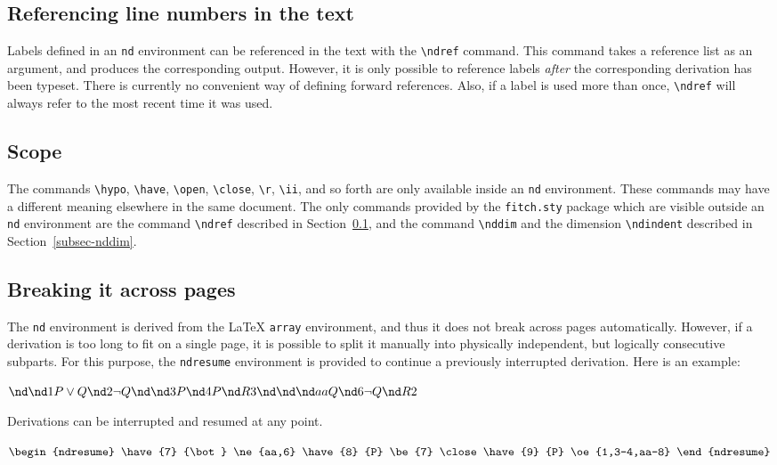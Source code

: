 \documentclass{ltxdoc}
\begin{document}
\subsection{Referencing line numbers in the text}
\label{subsec-ndref}

\DescribeMacro{\ndref}
Labels defined in an \verb!nd! environment can be referenced in the
text with the \verb!\ndref! command. This command takes a reference
list as an argument, and produces the corresponding output. However,
it is only possible to reference labels \emph{after} the corresponding
derivation has been typeset. There is currently no convenient way of
defining forward references. Also, if a label is used more than once,
\verb!\ndref! will always refer to the most recent time it was used.

\subsection{Scope}

The commands \verb!\hypo!, \verb!\have!, \verb!\open!, \verb!\close!,
\verb!\r!, \verb!\ii!, and so forth are only available inside an
\verb!nd! environment. These commands may have a different meaning
elsewhere in the same document. The only commands provided by the
\verb!fitch.sty!  package which are visible outside an \verb!nd!
environment are the command \verb!\ndref! described in
Section~\ref{subsec-ndref}, and the command \verb!\nddim! and the
dimension \verb!\ndindent! described in Section~\ref{subsec-nddim}.

\subsection{Breaking it across pages}\label{subsec-break}

\DescribeMacro{\ndresume}
The \verb!nd! environment is derived from the {\LaTeX} \verb!array!
environment, and thus it does not break across pages automatically. 
However, if a derivation is too long to fit on a single page, it is
possible to split it manually into physically independent, but
logically consecutive subparts. For this purpose, the \verb!ndresume!
environment is provided to continue a previously interrupted
derivation. Here is an example:

\begin{LTXexample}
$
\begin{nd}
  \hypo {1}  {P\vee Q}
  \hypo {2}  {\neg Q}
  \open
  \hypo {3} {P}
  \have {4} {P}      \r{3}
  \close
  \open
  \hypo {aa} {Q}
  \have {6} {\neg Q} \r{2}
\end{nd}
$

Derivations can be interrupted and 
resumed at any point.

$
\begin{ndresume}
  \have {7} {\bot}  \ne{aa,6}
  \have {8} {P}     \be{7}
  \close
  \have {9} {P}     \oe{1,3-4,aa-8}
\end{ndresume}
$
\end{LTXexample}
\end{document}
